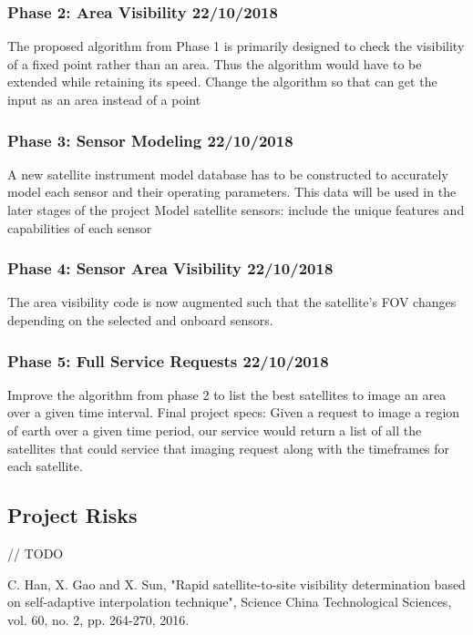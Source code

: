 \documentclass[12pt]{article}
\begin{document}
\subsubsection*{Phase 2: Area Visibility \hfill 22/10/2018}
 The proposed algorithm from Phase 1 is primarily designed to check the visibility of a fixed point rather than an area. Thus the algorithm would have to be extended while retaining its speed.
Change the algorithm so that can get the input as an area instead of a point 

\subsubsection*{Phase 3: Sensor Modeling \hfill 22/10/2018}
A new satellite  instrument model database has to be constructed to accurately model each sensor and their operating parameters. This data will be used in the later stages of the project
Model satellite sensors: include the unique features and capabilities of each sensor

\subsubsection*{Phase 4: Sensor Area Visibility \hfill 22/10/2018}
The area visibility code is now augmented such that the satellite's FOV changes depending on the selected and onboard sensors. 

\subsubsection*{Phase 5: Full Service Requests \hfill 22/10/2018}
Improve the algorithm from phase 2 to list the best satellites to image an area over a given time interval. 
Final project specs:
Given a request to image a region of earth over a given time period, our service would return a list of all the satellites that could service that imaging request along with the timeframes for each satellite.

\subsection*{Project Risks}
// TODO

\newpage
{}
\begin{thebibliography}{9}
 C. Han, X. Gao and X. Sun, "Rapid satellite-to-site visibility determination based on self-adaptive interpolation technique", Science China Technological Sciences, vol. 60, no. 2, pp. 264-270, 2016. 
\end{thebibliography}
\end{document}
